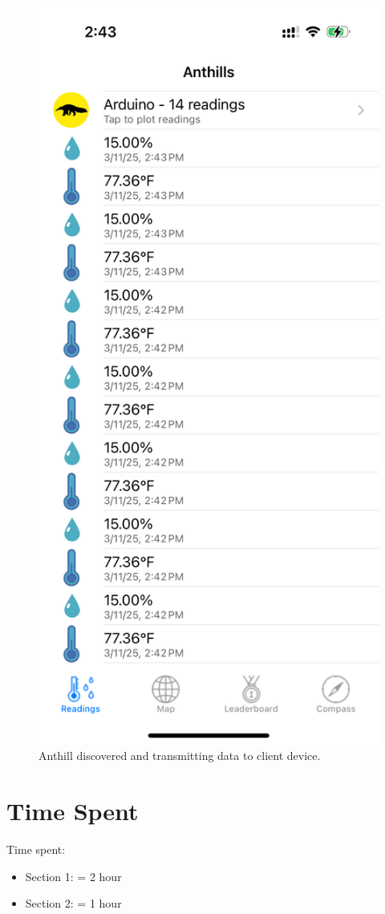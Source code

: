 \documentclass{lab}
\begin{document}
\begin{figure}[h]
    \begin{center}
    \includegraphics[height=0.35\textheight]{images/anthill.png} 
    \caption{Anthill discovered and transmitting data to client device.}
    \end{center}
\end{figure}


\section{Time Spent} 

Time spent:

\begin{itemize}
  \item Section 1: = 2 hour
  \item Section 2: = 1 hour
\end{itemize}
\end{document}
